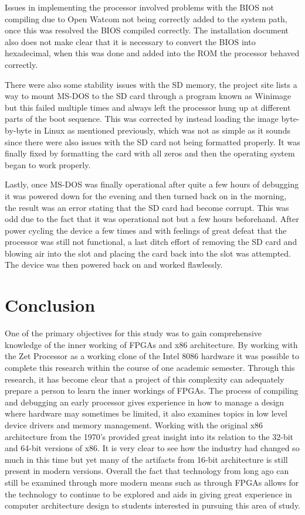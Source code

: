 \documentclass[11pt,peerreview, onecolumn]{IEEEtran}
\begin{document}
Issues in implementing the processor involved problems with the BIOS not compiling due to Open Watcom not being correctly added to the system path, once this was resolved the BIOS compiled correctly. The installation document also does not make clear that it is necessary to convert the BIOS into hexadecimal, when this was done and added into the ROM the processor behaved correctly. 

There were also some stability issues with the SD memory, the project site lists a way to mount MS-DOS to the SD card through a program known as Winimage but this failed multiple times and always left the processor hung up at different parts of the boot sequence. This was corrected by instead loading the image byte-by-byte in Linux as mentioned previously, which was not as simple as it sounds since there were also issues with the SD card not being formatted properly. It was finally fixed by formatting the card with all zeros and then the operating system began to work properly.

Lastly, once MS-DOS was finally operational after quite a few hours of debugging it was powered down for the evening and then turned back on in the morning, the result was an error stating that the SD card had become corrupt. This was odd due to the fact that it was operational not but a few hours beforehand. After power cycling the device a few times and with feelings of great defeat that the processor was still not functional, a last ditch effort of removing the SD card and blowing air into the slot and placing the card back into the slot was attempted. The device was then powered back on and worked flawlessly.

\section{Conclusion}
One of the primary objectives for this study was to gain comprehensive knowledge of the inner working of FPGAs and x86 architecture. By working with the Zet Processor as a working clone of the Intel 8086 hardware it was possible to complete this research within the course of one academic semester. Through this research, it has become clear that a project of this complexity can adequately prepare a person to learn the inner workings of FPGAs. The process of compiling and debugging an early processor gives experience in how to manage a design where hardware may sometimes be limited, it also examines topics in low level device drivers and memory management. Working with the original x86 architecture from the 1970's provided great insight into its relation to the 32-bit and 64-bit versions of x86. It is very clear to see how the industry had changed so much in this time but yet many of the artifacts from 16-bit architecture is still present in modern versions. Overall the fact that technology from long ago can still be examined through more modern means such as through FPGAs allows for the technology to continue to be explored and aids in giving great experience in computer architecture design to students interested in pursuing this area of study.
\end{document}
